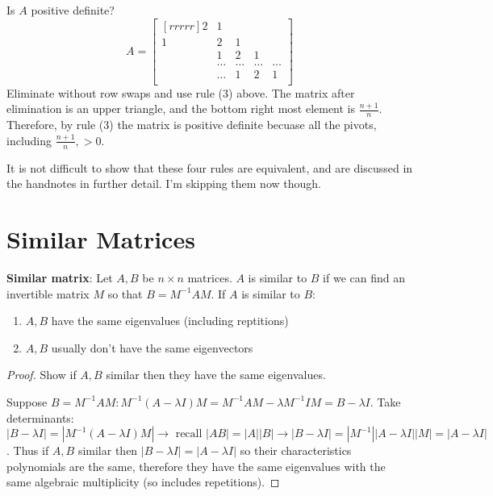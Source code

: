 \begin{example}
    Is  $A$ positive definite?
    \[A=\begin{bmatrix}[rrrrr]
     2 & 1 &  & &   \\
     1 & 2 & 1 & &    \\
      & 1 & 2 & 1 &   \\
      & \dots & \dots & \dots & \dots  \\
      & \dots & 1& 2 & 1 \\
 \end{bmatrix}\]
    Eliminate without row swaps and use rule (3) above. The matrix after elimination is an upper triangle, and the bottom right most element is $\frac{n+1}{n}$. Therefore, by rule (3) the matrix is positive definite becuase all the pivots, including $\frac{n+1}{n}, >0$.
\end{example}

It is not difficult to show that these four rules are equivalent, and are discussed in the handnotes in further detail. I'm skipping them now though.



\section{Similar Matrices}

\begin{definition}
    \textbf{Similar matrix}: Let $A, B$ be $n \times n$ matrices. $A$ is similar to $B$ if we can find an invertible matrix $M$ so that $B=M^{-1}AM$. If $A$ is similar to $B$:
    \begin{enumerate}
        \item $A,B$ have the same eigenvalues (including reptitions)
        \item $A,B$ usually don't have the same eigenvectors
    \end{enumerate}
\end{definition}

\begin{proof}
    Show if $A,B$ similar then they have the same eigenvalues.

    Suppose $B=M^{-1}AM: M^{-1}(A-\lambda I)M=M^{-1}AM-\lambda M^{-1} I M = B-\lambda I$. Take determinants: $|B-\lambda I | = |M^{-1} (A -\lambda I)M| \rightarrow \text{ recall } |AB|=|A| |B| \rightarrow |B-\lambda I | = |M^{-1}| |A -\lambda I| |M| = |A -\lambda I|$. Thus if $A,B$ similar then $|B-\lambda I | =|A-\lambda I |$ so their characteristics polynomials are the same, therefore they have the same eigenvalues with the same algebraic multiplicity (so includes repetitions).
\end{proof}


